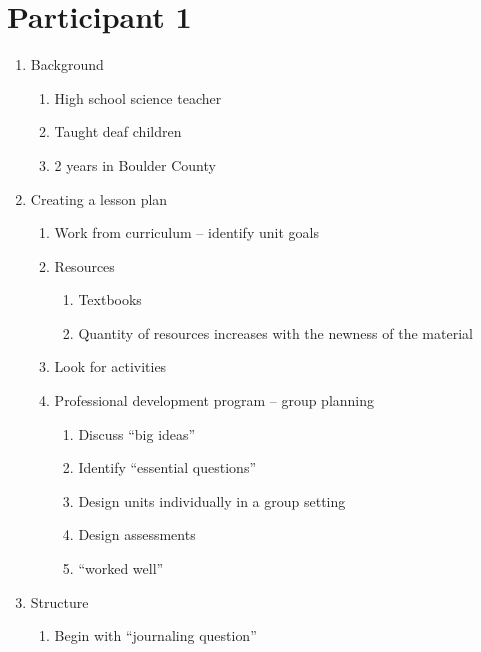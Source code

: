 \documentclass[11pt,letter]{article}
\begin{document}
\section*{Participant 1}
\begin{enumerate}
	\item Background
		\begin{enumerate}
			\item High school science teacher

			\item Taught deaf children

			\item 2 years in Boulder County
		\end{enumerate}

	\item Creating a lesson plan
		\begin{enumerate}
			\item Work from curriculum -- identify unit goals

			\item Resources
				\begin{enumerate}
					\item Textbooks

					\item Quantity of resources increases with the newness of
						the material

				\end{enumerate}

			\item Look for activities

			\item Professional development program -- group planning
				\begin{enumerate}
					\item Discuss ``big ideas''

					\item Identify ``essential questions''

					\item Design units individually in a group setting

					\item Design assessments

					\item ``worked well''

				\end{enumerate}

		\end{enumerate}

	\item Structure
		\begin{enumerate}
			\item Begin with ``journaling question''


\end{enumerate}
\end{enumerate}
\end{document}
